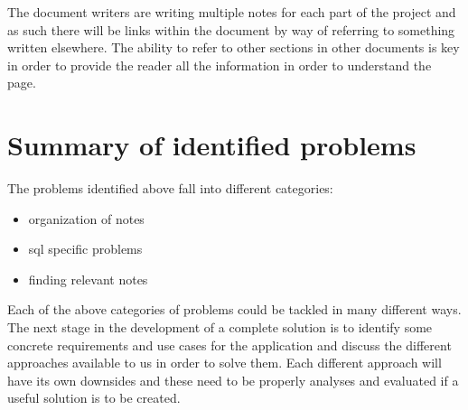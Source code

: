 The document writers are writing multiple notes for each part of the
project and as such there will be links within the document by way of
referring to something written elsewhere. The ability to refer to other
sections in other documents is key in order to provide the reader all
the information in order to understand the page.

\section{Summary of identified
problems}\label{summary-of-identified-problems}

The problems identified above fall into different categories:

\begin{itemize}
\tightlist
\item
  organization of notes
\item
  sql specific problems
\item
  finding relevant notes
\end{itemize}

Each of the above categories of problems could be tackled in many
different ways. The next stage in the development of a complete solution
is to identify some concrete requirements and use cases for the
application and discuss the different approaches available to us in
order to solve them. Each different approach will have its own downsides
and these need to be properly analyses and evaluated if a useful
solution is to be created.
